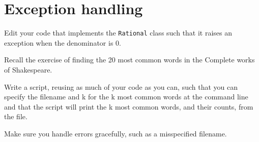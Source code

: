 \section{Exception handling} %
\label{sec:exception_handling}
\begin{questions}
    \label{sub:rational_numbers}

        Edit your code that implements the \texttt{Rational} class such that
        it raises an exception when the denominator is $0$.


    \label{sub:wordcount}

        Recall the exercise of finding the 20 most common words in the Complete
        works of Shakespeare.

        Write a script, reusing as much of your code as you can, such that you can specify the filename and k for the k most common words at the command line
        and that the script will print the k most
        common words, and their counts, from the file.

        Make sure you handle errors gracefully, such as a misspecified filename.

\end{questions}

